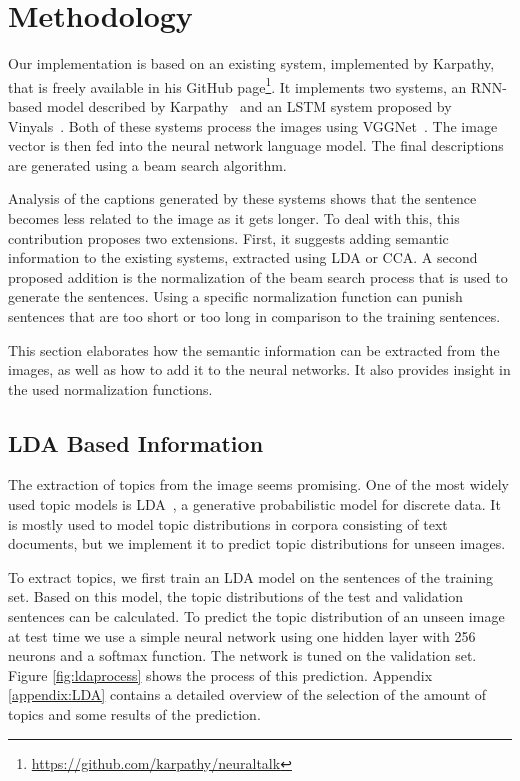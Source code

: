 \documentclass[twoside,twocolumn]{article}
\begin{document}
\section{Methodology}
\label{sec:methodology}
Our implementation is based on an existing system, implemented by Karpathy, that is freely available in his GitHub page\footnote{\url{https://github.com/karpathy/neuraltalk}}. It implements two systems, an RNN-based model described by Karpathy~\cite{Karpathy2015} and an LSTM system proposed by Vinyals~\cite{Google}. Both of these systems process the images using VGGNet~\cite{Arge2015}. The image vector is then fed into the neural network language model. The final descriptions are generated using a beam search algorithm.

Analysis of the captions generated by these systems shows that the sentence becomes less related to the image as it gets longer. To deal with this, this contribution proposes two extensions. First, it suggests adding semantic information to the existing systems, extracted using LDA or CCA. A second proposed addition is the normalization of the beam search process that is used to generate the sentences. Using a specific normalization function can punish sentences that are too short or too long in comparison to the training sentences.

This section elaborates how the semantic information can be extracted from the images, as well as how to add it to the neural networks. It also provides insight in the used normalization functions. 

\subsection{LDA Based Information}
\label{sec:LDAinfo}
The extraction of topics from the image seems promising. One of the most widely used topic models is LDA~\cite{Blei2012}, a generative probabilistic model for discrete data. It is mostly used to model topic distributions in corpora consisting of text documents, but we implement it to predict topic distributions for unseen images.

To extract topics, we first train an LDA model on the sentences of the training set. Based on this model, the topic distributions of the test and validation sentences can be calculated. To predict the topic distribution of an unseen image at test time we use a simple neural network using one hidden layer with 256 neurons and a softmax function. The network is tuned on the validation set. Figure \ref{fig:ldaprocess} shows the process of this prediction. Appendix \ref{appendix:LDA} contains a detailed overview of the selection of the amount of topics and some results of the prediction. 
\end{document}
